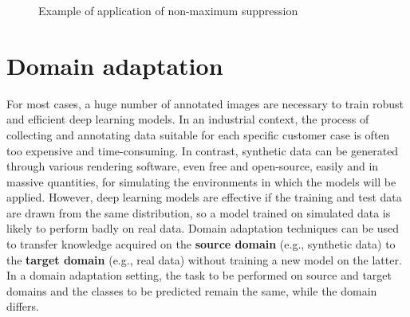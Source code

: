 \documentclass[%
    corpo=12pt,
    twoside,
    stile=classica,   
    tipotesi=magistrale,
    evenboxes,
    english
]{toptesi}
\begin{document}
\begin{figure}[ht]
	\centering
	\caption{Example of application of non-maximum suppression}
	\label{fig:nms}
\end{figure}


\section{Domain adaptation}


For most cases, a huge number of annotated images are necessary to train robust and efficient deep learning models. In an industrial context, the process of collecting and annotating data suitable for each specific customer case is often too expensive and time-consuming. In contrast, synthetic data can be generated through various rendering software, even free and open-source, easily and in massive quantities, for simulating the environments in which the models will be applied. However, deep learning models are effective if the training and test data are drawn from the same distribution, so a model trained on simulated data is likely to perform badly on real data. Domain adaptation techniques can be used to transfer knowledge acquired on the \textbf{source domain} (e.g., synthetic data) to the \textbf{target domain} (e.g., real data) without training a new model on the latter. In a domain adaptation setting, the task to be performed on source and target domains and the classes to be predicted remain the same, while the domain differs.
\end{document}

